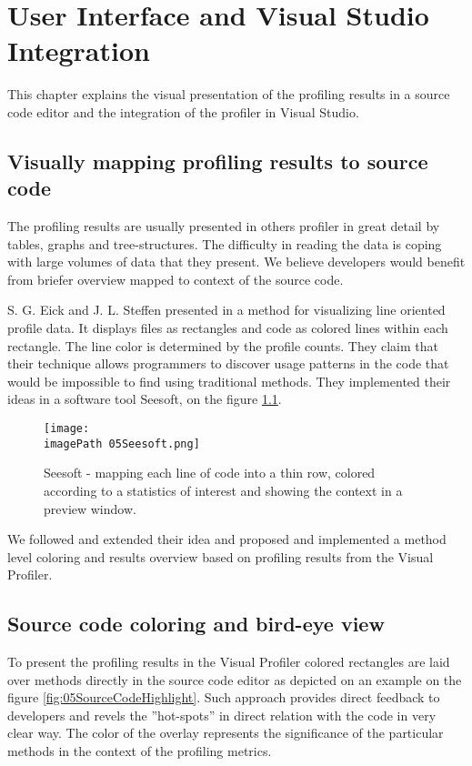 \chapter{User Interface and Visual Studio Integration }
\label{chap:VPUIandSI}


This chapter explains the visual presentation of the profiling results in a source code editor and the integration of the profiler in Visual Studio.

\section{Visually mapping profiling results to source code}
The profiling results are usually presented in others profiler in great detail by tables, graphs and tree-structures. The difficulty in reading the data is coping with large volumes of data that they present. We believe developers would benefit from briefer overview mapped to context of the source code.

S. G. Eick and J. L. Steffen presented in \cite{EickSteffen92} a method for visualizing line oriented profile data. It displays files as rectangles and code as colored lines within each rectangle. The line color is determined by the profile counts. They claim that their technique allows programmers to discover usage patterns in the code that would be impossible to find using traditional methods. They implemented their ideas in a software tool Seesoft, on the figure \ref{fig:05SeeSoft}.

\begin{figure}
	\centering
		\texttt{[image: \\imagePath 05Seesoft.png]}
		\caption{Seesoft - mapping each line of code into a thin row, colored according to a statistics of interest and showing the context in a preview window.}
	\label{fig:05SeeSoft}
\end{figure}


We followed and extended their idea and proposed and implemented a method level coloring and results overview based on profiling results from the Visual Profiler. 

\section{Source code coloring and bird-eye view}
To present the profiling results in the Visual Profiler colored rectangles are laid over methods directly in the source code editor as depicted on an example on the figure \ref{fig:05SourceCodeHighlight}. Such approach provides direct feedback to developers and revels the ''hot-spots'' in direct relation with the code in very clear way.  The color of the overlay represents the significance of the particular methods in the context of the profiling metrics.

